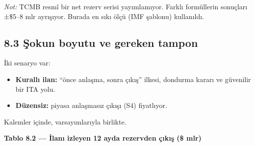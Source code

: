 \endgroup

\emph{Not:} TCMB resmî bir net rezerv serisi yayımlamıyor. Farklı formüllerin sonuçları ±\$5--8 mlr ayrışıyor. Burada en sıkı ölçü (IMF şablonu) kullanıldı.

\hypertarget{02c_hazirlik-83-ux15fokun-boyutu-ve-gereken-tampon}{%
\subsection{8.3 Şokun boyutu ve gereken tampon}\label{02c_hazirlik-83-ux15fokun-boyutu-ve-gereken-tampon}}

İki senaryo var:

\begin{itemize}
\tightlist
\item
  \textbf{Kurallı ilan:} ``önce anlaşma, sonra çıkış'' ilkesi, dondurma kararı ve güvenilir bir ITA yolu.
\item
  \textbf{Düzensiz:} piyasa anlaşmasız çıkışı (S4) fiyatlıyor.
\end{itemize}

Kalemler  içinde, varsayımlarıyla birlikte.


\textbf{Tablo 8.2 --- İlanı izleyen 12 ayda rezervden çıkış (\$ mlr)}

\nopagebreak[4]

\begingroup\gbtablo\small

